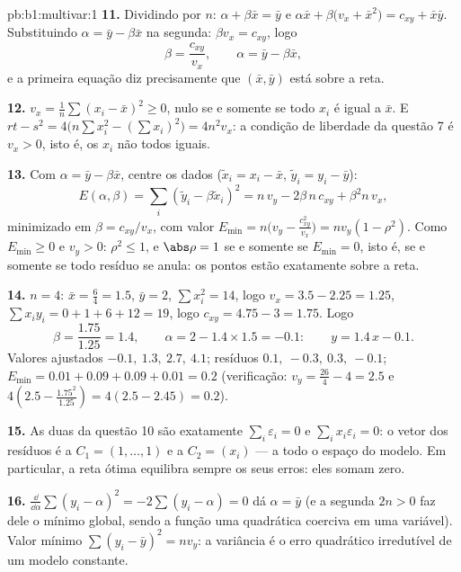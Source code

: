 \begin{solution}{pb:b1:multivar:1}
\textbf{11.} Dividindo por $n$: $\alpha + \beta\bar x = \bar y$ e $\alpha\bar x + \beta\bigl(v_x + \bar x^2\bigr) = c_{xy} +
\bar x\bar y$. Substituindo $\alpha = \bar y - \beta\bar x$ na
segunda: $\beta v_x = c_{xy}$, logo
\[
\beta = \frac{c_{xy}}{v_x}, \qquad \alpha = \bar y - \beta\bar
x ,
\]
e a primeira equação diz precisamente que $(\bar x, \bar y)$ está sobre a reta.

\textbf{12.} $v_x = \frac1n\sum(x_i - \bar x)^2 \geq 0$, nulo se e somente se todo $x_i$ é igual a
$\bar x$. E $rt - s^2 = 4\bigl(n\sum
x_i^2 - (\sum x_i)^2\bigr) = 4n^2 v_x$: a condição de liberdade da questão 7 é $v_x > 0$,
isto é, os $x_i$ não todos iguais.

\textbf{13.} Com $\alpha = \bar y - \beta\bar x$, centre os dados ($\tilde x_i = x_i - \bar x$, $\tilde y_i = y_i - \bar y$):
\[
E(\alpha, \beta) = \sum_i(\tilde y_i - \beta\tilde x_i)^2
= n\,v_y - 2\beta\,n\,c_{xy} + \beta^2 n\,v_x ,
\]
minimizado em $\beta = c_{xy}/v_x$, com valor $E_{\min} =
n\bigl(v_y - \frac{c_{xy}^2}{v_x}\bigr) = n v_y(1 - \rho^2)$. Como $E_{\min} \geq 0$ e $v_y > 0$: $\rho^2 \leq 1$,
e $\abs\rho = 1$ se e somente se $E_{\min} = 0$, isto é, se e somente se todo resíduo
se anula: os pontos estão exatamente sobre a reta.

\textbf{14.} $n = 4$: $\bar x = \frac64 = 1.5$, $\bar y = 2$, $\sum x_i^2 = 14$, logo $v_x = 3.5 - 2.25 = 1.25$, $\sum x_iy_i =
0 + 1 + 6 + 12 = 19$, logo
$c_{xy} = 4.75 - 3 = 1.75$. Logo
\[
\beta = \frac{1.75}{1.25} = 1.4,
\qquad
\alpha = 2 - 1.4\times1.5 = -0.1 :
\qquad y = 1.4\,x - 0.1 .
\]
Valores ajustados $-0.1,\ 1.3,\ 2.7,\ 4.1$; resíduos $0.1,\ -0.3,\
0.3,\ -0.1$; $E_{\min} = 0.01 + 0.09 + 0.09 + 0.01 = 0.2$ (verificação: $v_y = \frac{26}4 - 4 = 2.5$ e
$4(2.5 -
\frac{1.75^2}{1.25}) = 4(2.5 - 2.45) = 0.2$).

\textbf{15.} As duas  da questão 10 são exatamente
$\sum_i\varepsilon_i = 0$ e $\sum_i x_i\varepsilon_i =
0$: o vetor dos resíduos é  a $C_1 = (1, \dots, 1)$ e a $C_2 = (x_i)$ ---
a todo o espaço do modelo. Em particular, a reta ótima equilibra
sempre os seus erros: eles somam zero.

\textbf{16.} $\frac{\dd}{\dd\alpha}\sum(y_i - \alpha)^2 =
-2\sum(y_i - \alpha) = 0$ dá $\alpha = \bar y$ (e a  segunda $2n > 0$ faz dele o
mínimo global, sendo a função uma quadrática coerciva em uma
variável). Valor mínimo $\sum(y_i - \bar y)^2 = n v_y$: a variância é o erro quadrático
irredutível de um modelo constante.


\end{solution}
